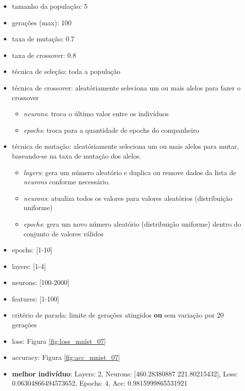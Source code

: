 \documentclass[twoside,conference,a4paper]{IEEEtran}
\begin{document}
\begin{itemize}
    \item tamanho da população: 5
    \item gerações (max): 100
    \item taxa de mutação: 0.7
    \item taxa de crossover: 0.8
    \item técnica de seleção: toda a população
    \item técnica de crossover: aleatóriamente seleciona um ou mais alelos para fazer o crossover
    \begin{itemize}
        \item \emph{neurons}: troca o último valor entre os indivíduos
        \item \emph{epochs}: troca para a quantidade de epochs do companheiro
    \end{itemize}
    \item técnica de mutação: aleatóriamente seleciona um ou mais alelos para mutar, baseando-se na taxa de mutação dos alelos.
    \begin{itemize}
        \item \emph{layers}: gera um número aleatório e duplica ou remove dados da lista de \emph{neurons} conforme necessário.
        \item \emph{neurons}: atualiza todos os valores para valores aleatórios (distribuição uniforme)
        \item \emph{epochs}: gera um novo número aleatório (distribuição uniforme) dentro do conjunto de valores válidos
    \end{itemize}
    \item epochs: [1-10]
    \item layers: [1-4]
    \item neurons: [100-2000]
    \item features: [1-100]
    \item critério de parada: limite de gerações atingidos \textbf{ou} sem variação por 20 gerações
    \item loss: Figura \ref{fig:loss_mnist_07}
    \item accuracy: Figura \ref{fig:acc_mnist_07}
    \item \textbf{melhor indivíduo}: Layers: 2, Neurons: [460.28380887 221.80215432], Loss: 0.06304866494573652, Epochs: 4, Acc: 0.9815999865531921
\end{itemize}
\end{document}
